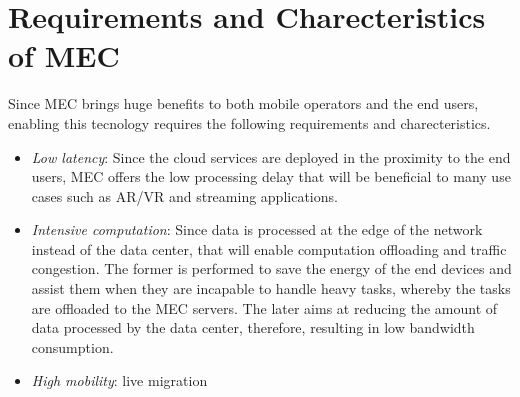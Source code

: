 \section{Requirements and Charecteristics of MEC}  \label{requirements}

Since MEC brings huge benefits to both mobile operators and the end users, enabling this tecnology requires the following requirements and charecteristics.

\begin{itemize}

\item \textit{\textit{Low latency}}: Since the cloud services are deployed in the proximity to the end users, MEC offers the low processing delay that will be beneficial to many use cases such as AR/VR and streaming applications.

\item \textit{\textit{Intensive computation}}: Since data is processed at the edge of the network instead of the data center, that will enable computation offloading and traffic congestion. The former is performed to save the energy of the end devices and assist them when they are incapable to handle heavy tasks, whereby the tasks are offloaded to the MEC servers. The later aims at reducing the amount of data processed by the data center, therefore, resulting in low bandwidth consumption.

\item \textit{\textit{High mobility}}: live migration

\end{itemize}
